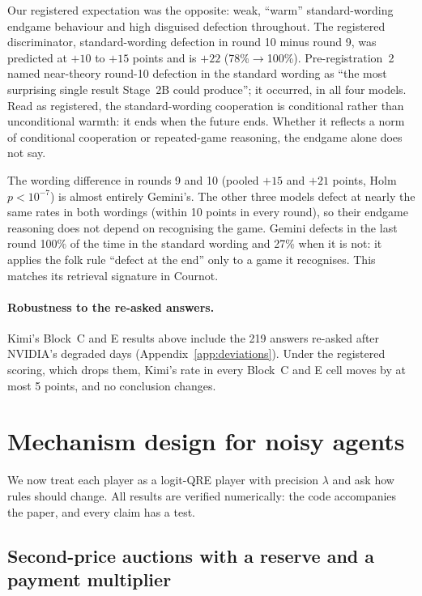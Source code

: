 \documentclass[10pt]{article}
\theoremstyle{definition}
\theoremstyle{remark}
\newcommand{\lam}{\lambda}
\begin{document}
Our registered expectation was the opposite: weak, ``warm'' standard-wording endgame behaviour and
high disguised defection throughout. The registered discriminator, standard-wording defection in round 10
minus round 9, was predicted at $+10$ to $+15$ points and is $+22$ (78\%$\to$100\%).
Pre-registration~2 named near-theory round-10 defection in the standard wording as ``the most
surprising single result Stage~2B could produce''; it occurred, in all four models. Read as registered, the standard-wording cooperation is conditional rather than unconditional
warmth: it ends when the future ends. Whether it reflects a norm of conditional cooperation or
repeated-game reasoning, the endgame alone does not say.

The wording difference in rounds 9 and 10 (pooled $+15$ and $+21$ points, Holm $p<10^{-7}$) is
almost entirely Gemini's. The other three models defect at nearly the same rates in both
wordings (within 10 points in every round), so their endgame reasoning does not depend on
recognising the game. Gemini defects in the last round 100\% of the time in the standard wording
and 27\% when it is not: it applies the folk rule ``defect at the end'' only to a game it
recognises. This matches its retrieval signature in Cournot.

\paragraph{Robustness to the re-asked answers.} Kimi's Block~C and E results above include the
219 answers re-asked after NVIDIA's degraded days (Appendix~\ref{app:deviations}). Under the
registered scoring, which drops them, Kimi's rate in every Block~C and E cell moves by at most
5 points, and no conclusion changes.


\section{Mechanism design for noisy agents}\label{sec:mechanism}

We now treat each player as a logit-QRE player with precision $\lam$ and ask how rules should
change. All results are verified numerically: the code accompanies the paper, and every claim
has a test.

\subsection{Second-price auctions with a reserve and a payment multiplier}
\end{document}
